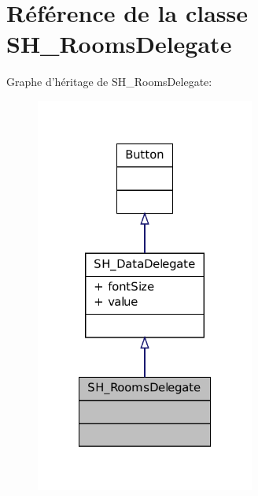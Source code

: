 \hypertarget{classSH__RoomsDelegate}{\section{Référence de la classe S\-H\-\_\-\-Rooms\-Delegate}
\label{classSH__RoomsDelegate}
}


Graphe d'héritage de S\-H\-\_\-\-Rooms\-Delegate\-:
\nopagebreak
\begin{figure}[H]
\begin{center}
\leavevmode
\includegraphics[width=204pt]{classSH__RoomsDelegate__inherit__graph}
\end{center}
\end{figure}


